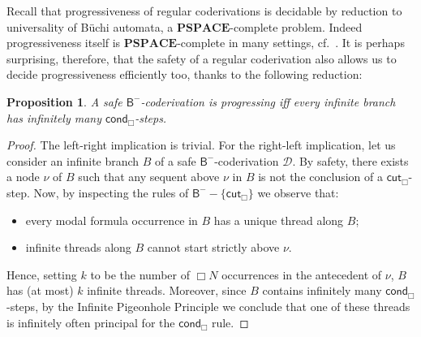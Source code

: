\documentclass[manuscript,screen]{acmart}
\renewcommand{\setminus}{-}
\newtheorem{prop}[thm]{Proposition}
\theoremstyle{definition}
\theoremstyle{remark}
\newcommand{\n}{N}
\newcommand{\sq}{\Box}
\newcommand{\sqn}{{\sq\n}}
\newcommand{\sn}{\sqn}
\newcommand{\pspace}{\mathbf{PSPACE}}
\newcommand{\cnd}{\mathsf{cond}}
\newcommand{\bc}{\mathsf{B}}
\newcommand{\bcnorec}{\bc^{-}}
\newcommand{\der}{\mathcal{D}}
\newcommand{\cut}{\mathsf{cut}}
\begin{document}
Recall that progressiveness of regular coderivations is decidable by reduction to universality of B\"uchi automata, a $\pspace$-complete problem.
Indeed progressiveness itself is $\pspace$-complete in many settings, cf.~\cite{NolletST19}.
It is perhaps surprising, therefore, that the safety of a regular coderivation also allows us to decide progressiveness efficiently too, thanks to the following reduction:
\begin{prop}\label{prop:regular-safe-progressing-iff-infinite-branch-infinite-cond}
A  safe  $\bcnorec$-coderivation is progressing iff every infinite branch has infinitely many $\cnd_\sq$-steps.
\end{prop}
\begin{proof}
The left-right implication is trivial. For the right-left implication, let us consider an infinite branch $B$ of a  safe $\bcnorec$-coderivation $\der$. By safety, there exists  a node $\nu$ of $B$ such that any sequent  above $\nu$ in $B$ is not the conclusion of a $\cut_\sq$-step. Now, by inspecting the rules of $\bcnorec \setminus \{ \cut_\sq \}$ we  observe that:
\begin{itemize}
    \item every modal formula occurrence in $B$ has a unique thread along $B$;
    \item infinite threads along $B$ cannot start strictly above $\nu$. 
\end{itemize}
Hence, setting $k$ to be the number of $\sn$ occurrences in the antecedent of $\nu$, $B$ has (at most) $ k$ infinite threads. Moreover, since $B$ contains infinitely many $\cnd_\sq$-steps, by the Infinite Pigeonhole Principle we conclude that  one of these  threads is infinitely often principal for the $\cnd_\sq$ rule. 
\end{proof}
\end{document}
